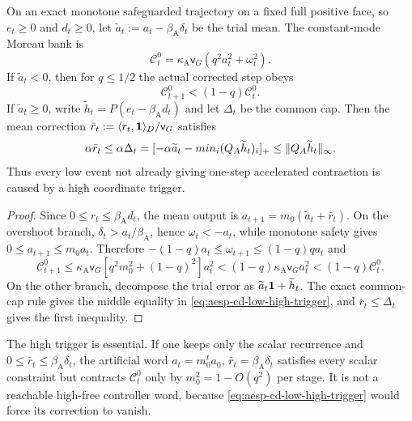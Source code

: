 \begin{proposition}
\label{prop:aesp-cd-low-overshoot-trigger}
On an exact monotone safeguarded trajectory on a fixed full positive face,
so $e_t\geq0$ and $d_t\geq0$, let
$\widetilde a_t:=a_t-\beta_{\mathrm A}\delta_t$ be the trial mean.  The
constant-mode Moreau bank is
\begin{equation*}
 \mathcal C_t^0
 =\kappa_{\mathrm A}\mathsf v_G
   (q^2a_t^2+\omega_t^2).
\end{equation*}
If $\widetilde a_t<0$, then for $q\leq1/2$ the actual corrected step obeys
\begin{equation}
 \mathcal C_{t+1}^0<(1-q)\mathcal C_t^0.
 \label{eq:aesp-cd-low-overshoot-contract}
\end{equation}
If $\widetilde a_t\geq0$, write
$\widetilde h_t=P(e_t-\beta_{\mathrm A}d_t)$ and let $\Delta_t$ be the common
cap.  Then the mean correction
$\bar r_t:=\langle r_t,\mathbf{1}\rangle_D/\mathsf v_G$ satisfies
\begin{equation}
 \alpha\bar r_t
 \leq\alpha\Delta_t
 =[-\alpha\widetilde a_t-min_i(Q_A\widetilde h_t)_i]_+
 \leq\lVert Q_A\widetilde h_t\rVert_\infty.
 \label{eq:aesp-cd-low-high-trigger}
\end{equation}
Thus every low event not already giving one-step accelerated contraction is
caused by a high coordinate trigger.
\end{proposition}

\begin{proof}
Since $0\leq r_t\leq\beta_{\mathrm A}d_t$, the mean output is
$a_{t+1}=m_0(\widetilde a_t+\bar r_t)$.  On the overshoot branch,
$\delta_t>a_t/\beta_{\mathrm A}$, hence $\omega_t<-a_t$, while monotone safety gives
$0\leq a_{t+1}\leq m_0a_t$.  Therefore
$-(1-q)a_t\leq\omega_{t+1}\leq(1-q)qa_t$ and
\begin{equation*}
 \mathcal C_{t+1}^0
 \leq\kappa_{\mathrm A}\mathsf v_G
 [q^2m_0^2+(1-q)^2]a_t^2
 <(1-q)\kappa_{\mathrm A}\mathsf v_Ga_t^2
 <(1-q)\mathcal C_t^0.
\end{equation*}
On the other branch, decompose the trial error as
$\widetilde a_t\mathbf{1}+\widetilde h_t$.  The exact common-cap rule gives the
middle equality in \cref{eq:aesp-cd-low-high-trigger}, and
$\bar r_t\leq\Delta_t$ gives the first inequality.
\end{proof}

The high trigger is essential.  If one keeps only the scalar recurrence and
$0\leq\bar r_t\leq\beta_{\mathrm A}\delta_t$, the artificial word
$a_t=m_0^ta_0$, $\bar r_t=\beta_{\mathrm A}\delta_t$ satisfies every scalar
constraint but contracts $\mathcal C_t^0$ only by $m_0^2=1-O(q^2)$ per
stage.  It is not a reachable high-free controller word, because
\cref{eq:aesp-cd-low-high-trigger} would force its correction to vanish.

